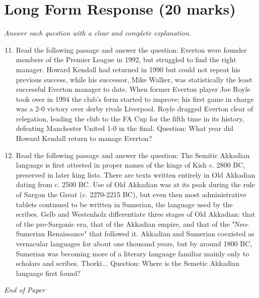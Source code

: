 \documentclass[12pt]{article}
\begin{document}
\section*{Long Form Response (20 marks)}
\textit{Answer each question with a clear and complete explanation.}
\begin{enumerate}[label=\arabic*.]
\setcounter{enumi}{10}
\item Read the following passage and answer the question: Everton were founder members of the Premier League in 1992, but struggled to find the right manager. Howard Kendall had returned in 1990 but could not repeat his previous success, while his successor, Mike Walker, was statistically the least successful Everton manager to date. When former Everton player Joe Royle took over in 1994 the club's form started to improve; his first game in charge was a 2-0 victory over derby rivals Liverpool. Royle dragged Everton clear of relegation, leading the club to the FA Cup for the fifth time in its history, defeating Manchester United 1-0 in the final. Question: What year did Howard Kendall return to manage Everton?
\item Read the following passage and answer the question: The Semitic Akkadian language is first attested in proper names of the kings of Kish c. 2800 BC, preserved in later king lists. There are texts written entirely in Old Akkadian dating from c. 2500 BC. Use of Old Akkadian was at its peak during the rule of Sargon the Great (c. 2270-2215 BC), but even then most administrative tablets continued to be written in Sumerian, the language used by the scribes. Gelb and Westenholz differentiate three stages of Old Akkadian: that of the pre-Sargonic era, that of the Akkadian empire, and that of the "Neo-Sumerian Renaissance" that followed it. Akkadian and Sumerian coexisted as vernacular languages for about one thousand years, but by around 1800 BC, Sumerian was becoming more of a literary language familiar mainly only to scholars and scribes. Thorki... Question: Where is the Semetic Akkadian language first found?
\end{enumerate}

\vfill
\noindent\textit{End of Paper}
\end{document}
